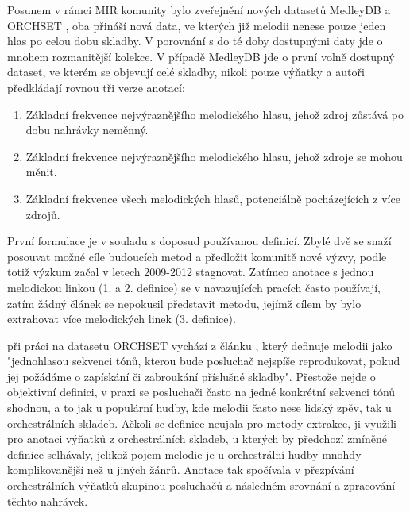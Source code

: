 Posunem v rámci MIR komunity bylo zveřejnění nových datasetů MedleyDB \citep{Bittner2014} a ORCHSET \citep{Bosch2016}, oba přináší nová data, ve kterých již melodii nenese pouze jeden hlas po celou dobu skladby. V porovnání s do té doby dostupnými daty jde o mnohem rozmanitější kolekce. V případě MedleyDB jde o první volně dostupný dataset, ve kterém se objevují celé skladby, nikoli pouze výňatky a autoři předkládají rovnou tři verze anotací:

\begin{enumerate}
    \item Základní frekvence nejvýraznějšího melodického hlasu, jehož zdroj zůstává po dobu nahrávky neměnný.
    \item Základní frekvence nejvýraznějšího melodického hlasu, jehož zdroje se mohou měnit.
    \item Základní frekvence všech melodických hlasů, potenciálně pocházejících z více zdrojů.
\end{enumerate}

První formulace je v souladu s doposud používanou definicí. Zbylé dvě se snaží posouvat možné cíle budoucích metod a předložit komunitě nové výzvy, podle \cite{Salamon2014} totiž výzkum začal v letech 2009-2012 stagnovat. Zatímco anotace s jednou melodickou linkou (1. a 2. definice) se v navazujících pracích často používají, zatím žádný článek se nepokusil představit metodu, jejímž cílem by bylo extrahovat více melodických linek (3. definice).

\cite{Bosch2016} při práci na datasetu ORCHSET vychází z článku \cite{Poliner2007}, který definuje melodii jako "jednohlasou sekvenci tónů, kterou bude posluchač nejspíše reprodukovat, pokud jej požádáme o zapískání či zabroukání příslušné skladby". Přestože nejde o objektivní definici, v praxi se posluchači často na jedné konkrétní sekvenci tónů shodnou, a to jak u populární hudby, kde melodii často nese lidský zpěv, tak u orchestrálních skladeb. Ačkoli se definice neujala pro metody extrakce, \cite{Bosch2016} ji využili pro anotaci výňatků z orchestrálních skladeb, u kterých by předchozí zmíněné definice selhávaly, jelikož pojem melodie je u orchestrální hudby mnohdy komplikovanější než u jiných žánrů. Anotace tak spočívala v přezpívání orchestrálních výňatků skupinou posluchačů a následném srovnání a zpracování těchto nahrávek.